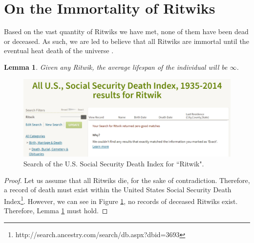 \documentclass[]{article}
\newtheorem{lemma}[theorem]{Lemma}
\begin{document}
\section{On the Immortality of Ritwiks}
\label{sec:Immortality}
Based on the vast quantity of Ritwiks we have met, none of them have been dead or deceased. As such, we are led to believe that all Ritwiks are immortal until the eventual heat death of the universe \cite{HeatDeath}.
\begin{lemma}
\label{lemma:death}
	Given any Ritwik, the average lifespan of the individual will be $\infty$.
\end{lemma}
\begin{figure}[h]
	\centering
	\includegraphics[width=5in]{figures/RitwikLackOfDeath}
	\caption{Search of the U.S. Social Security Death Index for ``Ritwik".}
	\label{fig:ritwiklackofdeath}
\end{figure}
\begin{proof}
Let us assume that all Ritwiks die, for the sake of contradiction. Therefore, a record of death must exist within the United States Social Security Death Index\footnote{http://search.ancestry.com/search/db.aspx?dbid=3693}. However, we can see in Figure \ref{fig:ritwiklackofdeath}, no records of deceased Ritwiks exist. Therefore, Lemma \ref{lemma:death} must hold.
\end{proof}
\end{document}
